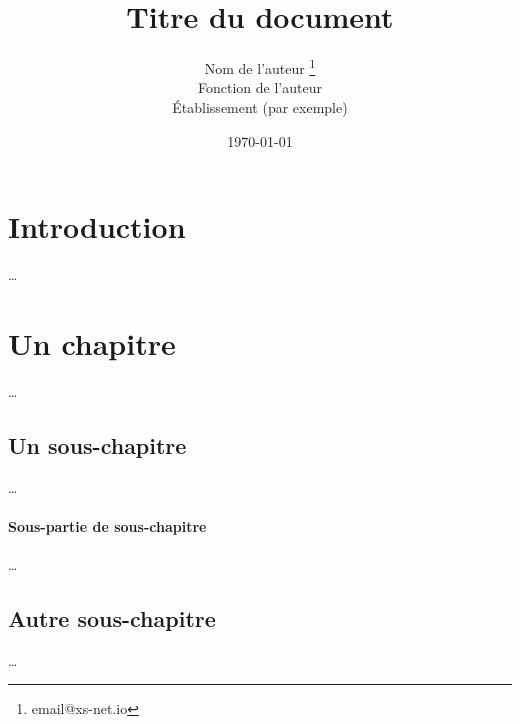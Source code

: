 \documentclass[french, 12pt, twoside, a4paper]{article}
\title{Titre du document}
\author{Nom de l'auteur \thanks{email@xs-net.io} \\
Fonction de l'auteur \\
Établissement (par exemple)}
\date{\today}
\begin{document}
\maketitle     %


\section*{Introduction}

…

\section{Un chapitre}
…

\subsection{Un sous-chapitre}
…
\paragraph{Sous-partie de sous-chapitre}
…

\subsection{Autre sous-chapitre}
…

%
\end{document}
